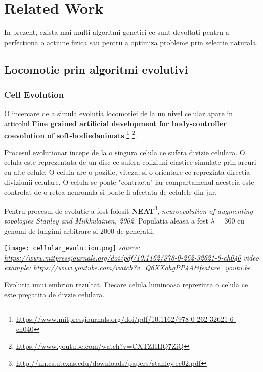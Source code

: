 \chapter{Related Work}

In prezent, exista mai multi algoritmi genetici ce sunt devoltati pentru a perfectiona o actiune fizica sau pentru a optimiza probleme prin selectie naturala. 
\section{Locomotie prin algoritmi evolutivi}

\subsection{Cell Evolution}
O incercare de a simula evolutia locomotiei de la un nivel celular apare in articolul \textbf{Fine grained artificial development for body-controller coevolution of soft-bodiedanimats} \footnote{\url{https://www.mitpressjournals.org/doi/pdf/10.1162/978-0-262-32621-6-ch040}} \footnote{\url{https://www.youtube.com/watch?v=CXTZHHQ7ZiQ}}. 

Procesul evolutionar incepe de la o singura celula ce sufera divizie celulara. O celula este reprezentata de un disc ce sufera coliziuni elastice simulate prin arcuri cu alte celule. O celula are o pozitie, viteza, si o orientare ce reprezinta directia diviziunii celulare. O celula se poate "contracta" iar compartamenul acesteia este controlat de o retea neuronala si poate fi afectata de celulele din jur.

Pentru procesul de evolutie a fost folosit \textbf{NEAT}\footnote{\url{http://nn.cs.utexas.edu/downloads/papers/stanley.ec02.pdf}}, \textit{neuroevolution of augmenting topologies  Stanley  and  Miikkulainen,  2002}. Populatia aleasa a fost $\lambda = 300$ cu genomi de lungimi arbitrare si 2000 de generatii.

\begin{center}
    \texttt{[image: cellular\_evolution.png]}\linebreak
    \textit{source: \url{https://www.mitpressjournals.org/doi/pdf/10.1162/978-0-262-32621-6-ch040}}\linebreak
    \textit{video example: \url{https://www.youtube.com/watch?v=Q6XXohgPP4A&feature=youtu.be}}
\end{center}

Evolutia unui embrion rezultat. Fiecare celula luminoasa reprezinta o celula ce este pregatita de divzie celulara.

